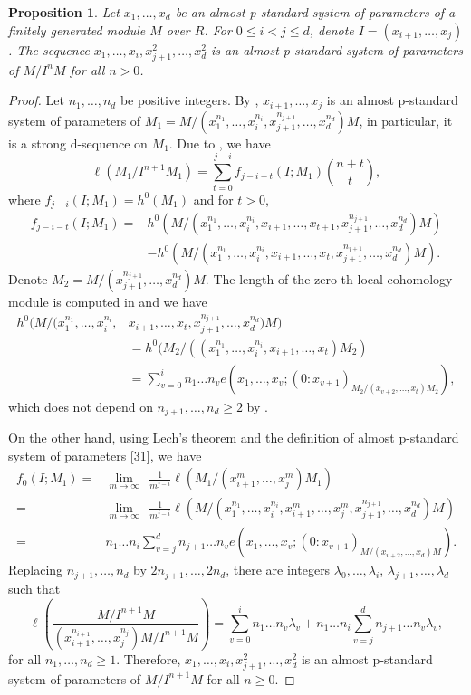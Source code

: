 \documentclass{amsart}
\newtheorem{proposition}[theorem]{Proposition}
\theoremstyle {definition}
\theoremstyle {remark}
\begin{document}
\begin{proposition}\label{33}
Let $x_1, \ldots, x_d$ be an almost p-standard system of parameters of a finitely generated module $M$ over $R$. For $0\leq i<j\leq d$, denote $I=(x_{i+1}, \ldots, x_j)$. The sequence $x_1, \ldots, x_i, x_{j+1}^2, \ldots, x_d^2$ is an almost p-standard system of parameters of $M/I^nM$ for all $n>0$.
\end{proposition}
\begin{proof} Let $n_1, \ldots, n_d$ be positive integers. By \cite{NTCDTC1}, $x_{i+1}, \ldots, x_j$ is an almost p-standard system of parameters of $M_1=M/(x_1^{n_1}, \ldots, x_i^{n_i}, x_{j+1}^{n_{j+1}}, \ldots, x_d^{n_d})M$, in particular, it is a strong d-sequence on $M_1$. Due to \cite[Theorem 4.1]{NVT1}, we have
$$\ell(M_1/I^{n+1}M_1)=\sum_{t=0}^{j-i}f_{j-i-t}(I; M_1)\binom{n+t}{t},$$
where $f_{j-i}(I; M_1)=h^0(M_1)$ and for $t>0$,
\[\begin{aligned}
f_{j-i-t}(I; M_1)=&h^0(M/(x_1^{n_1}, \ldots, x_i^{n_i}, x_{i+1}, \ldots, x_{t+1}, x_{j+1}^{n_{j+1}}, \ldots, x_d^{n_d})M)\\
&-h^0(M/(x_1^{n_1}, \ldots, x_i^{n_i}, x_{i+1}, \ldots, x_t, x_{j+1}^{n_{j+1}}, \ldots, x_d^{n_d})M).
\end{aligned}\]
Denote $M_2=M/(x_{j+1}^{n_{j+1}}, \ldots, x_d^{n_d})M$. The length of the zero-th local cohomology module is computed in \cite[Corollary 4.4]{DTCNam} and we have
\[\begin{aligned}
h^0(M/(x_1^{n_1}, \ldots, x_i^{n_i}, &x_{i+1}, \ldots, x_t, x_{j+1}^{n_{j+1}}, \ldots, x_d^{n_d})M)\\
&=h^0(M_2/((x_1^{n_1}, \ldots, x_i^{n_i}, x_{i+1}, \ldots, x_t)M_2)\\
&=\sum_{v=0}^in_1\ldots n_ve(x_1, \ldots, x_v; (0:x_{v+1})_{M_2/(x_{v+2}, \ldots, x_t)M_2}),
\end{aligned}\]
which does not depend on $n_{j+1}, \ldots, n_d\geq 2$ by \cite[Proposition 3.2]{DTCNam}.

On the other hand, using Lech's theorem and the definition of almost p-standard system of parameters \ref{31}, we have
\[\begin{aligned}
f_0(I; M_1)
=&\lim_{m \to \infty}\ \ \frac{1}{m^{j-i}}\ell(M_1/(x_{i+1}^m, \ldots, x_j^m)M_1)\\
=&\lim_{m \to \infty}\ \ \frac{1}{m^{j-i}}\ell(M/(x_1^{n_1}, \ldots, x_i^{n_i}, x_{i+1}^m, \ldots, x_j^m, x_{j+1}^{n_{j+1}}, \ldots, x_d^{n_d})M)\\
=&n_1\ldots n_i\sum_{v=j}^dn_{j+1}\ldots n_ve(x_1, \ldots, x_v; (0:x_{v+1})_{M/(x_{v+2}, \ldots, x_d)M}).
\end{aligned}\]
Replacing $n_{j+1}, \ldots, n_d$ by $2n_{j+1}, \ldots, 2n_d$, there are integers $\lambda_0, \ldots, \lambda_i$, $\lambda_{j+1}, \ldots, \lambda_d$ such that
$$\ell\left(\frac{M/I^{n+1}M}{(x_{i+1}^{n_{i+1}}, \ldots, x_j^{n_j})M/I^{n+1}M}\right)=\sum_{v=0}^in_1\ldots n_v\lambda_v+ n_1\ldots n_i\sum_{v=j}^dn_{j+1}\ldots n_v\lambda_v,$$
for all $n_1, \ldots, n_d\geq 1$. Therefore, $x_1, \ldots, x_i, x_{j+1}^2, \ldots, x_d^2$ is an almost p-standard system of parameters of $M/I^{n+1}M$ for all $n\geq 0$.
\end{proof}
\end{document}
